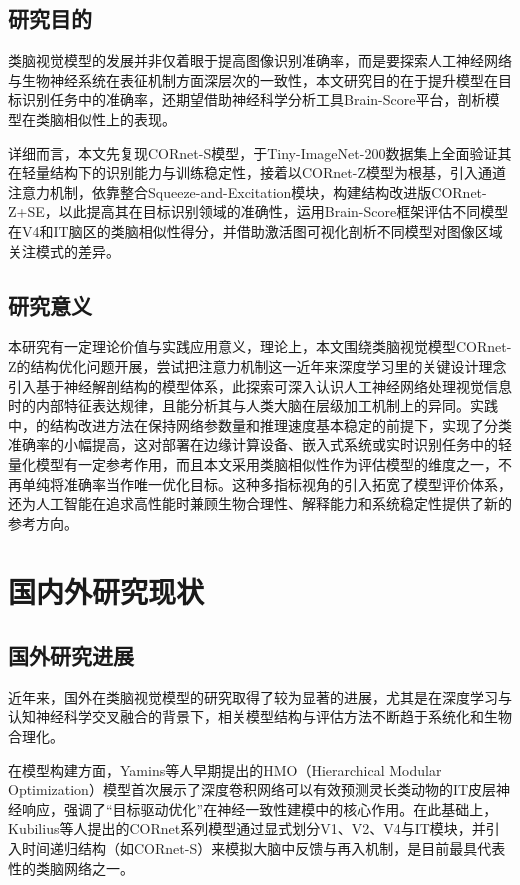 \subsection{研究目的}

类脑视觉模型的发展并非仅着眼于提高图像识别准确率，而是要探索人工神经网络与生物神经系统在表征机制方面深层次的一致性，本文研究目的在于提升模型在目标识别任务中的准确率，还期望借助神经科学分析工具Brain-Score平台，剖析模型在类脑相似性上的表现。

详细而言，本文先复现CORnet-S模型，于Tiny-ImageNet-200数据集上全面验证其在轻量结构下的识别能力与训练稳定性，接着以CORnet-Z模型为根基，引入通道注意力机制，依靠整合Squeeze-and-Excitation模块，构建结构改进版CORnet-Z+SE，以此提高其在目标识别领域的准确性，运用Brain-Score框架评估不同模型在V4和IT脑区的类脑相似性得分，并借助激活图可视化剖析不同模型对图像区域关注模式的差异。

\subsection{研究意义}

本研究有一定理论价值与实践应用意义，理论上，本文围绕类脑视觉模型CORnet-Z的结构优化问题开展，尝试把注意力机制这一近年来深度学习里的关键设计理念引入基于神经解剖结构的模型体系，此探索可深入认识人工神经网络处理视觉信息时的内部特征表达规律，且能分析其与人类大脑在层级加工机制上的异同。实践中，的结构改进方法在保持网络参数量和推理速度基本稳定的前提下，实现了分类准确率的小幅提高，这对部署在边缘计算设备、嵌入式系统或实时识别任务中的轻量化模型有一定参考作用，而且本文采用类脑相似性作为评估模型的维度之一，不再单纯将准确率当作唯一优化目标。这种多指标视角的引入拓宽了模型评价体系，还为人工智能在追求高性能时兼顾生物合理性、解释能力和系统稳定性提供了新的参考方向。

\section{国内外研究现状}

\subsection{国外研究进展}

近年来，国外在类脑视觉模型的研究取得了较为显著的进展，尤其是在深度学习与认知神经科学交叉融合的背景下，相关模型结构与评估方法不断趋于系统化和生物合理化。

在模型构建方面，Yamins等人早期提出的HMO（Hierarchical Modular Optimization）模型首次展示了深度卷积网络可以有效预测灵长类动物的IT皮层神经响应，强调了“目标驱动优化”在神经一致性建模中的核心作用\cite{yamins2014performance}。在此基础上，Kubilius等人提出的CORnet系列模型通过显式划分V1、V2、V4与IT模块，并引入时间递归结构（如CORnet-S）来模拟大脑中反馈与再入机制，是目前最具代表性的类脑网络之一\cite{kubilius2018cornet}。

